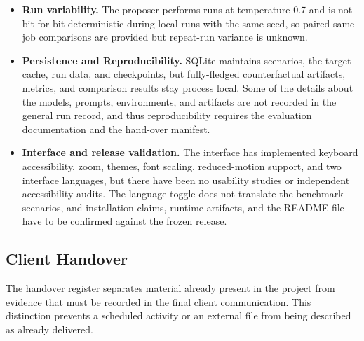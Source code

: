 \documentclass[11pt,a4paper]{article}
\begin{document}
\begin{itemize}
  \item \textbf{Run variability.} The proposer performs runs at temperature 0.7 and is
  not bit-for-bit deterministic during local runs with the same seed, so paired
  same-job comparisons are provided but repeat-run variance is unknown.
  \item \textbf{Persistence and Reproducibility.} SQLite maintains scenarios, the
  target cache, run data, and checkpoints, but fully-fledged counterfactual artifacts,
  metrics, and comparison results stay process local. Some of the details about the
  models, prompts, environments, and artifacts are not recorded in the general run
  record, and thus reproducibility requires the evaluation documentation and the
  hand-over manifest.
  \item \textbf{Interface and release validation.} The interface has implemented
  keyboard accessibility, zoom, themes, font scaling, reduced-motion support, and two
  interface languages, but there have been no usability studies or independent
  accessibility audits. The language toggle does not translate the benchmark
  scenarios, and installation claims, runtime artifacts, and the README file have to
  be confirmed against the frozen release.
\end{itemize}

\subsection{Client Handover}

The handover register separates material already present in the project from evidence
that must be recorded in the final client communication. This distinction prevents a
scheduled activity or an external file from being described as already delivered.
\end{document}
